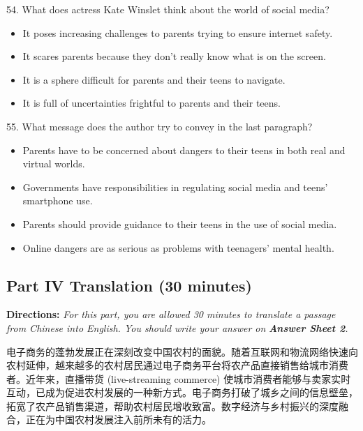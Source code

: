 \documentclass[UTF8,11pt]{ctexart}
\begin{document}
54. What does actress Kate Winslet think about the world of social media?


\begin{itemize}[leftmargin=2em,itemsep=.2em,topsep=.4em]\item[A.] It poses increasing challenges to parents trying to ensure internet safety.
\item[B.] It scares parents because they don’t really know what is on the screen.
\item[C.] It is a sphere difficult for parents and their teens to navigate.
\item[D.] It is full of uncertainties frightful to parents and their teens.
\end{itemize}

55. What message does the author try to convey in the last paragraph?


\begin{itemize}[leftmargin=2em,itemsep=.2em,topsep=.4em]\item[A.] Parents have to be concerned about dangers to their teens in both real and virtual worlds.
\item[B.] Governments have responsibilities in regulating social media and teens’ smartphone use.
\item[C.] Parents should provide guidance to their teens in the use of social media.
\item[D.] Online dangers are as serious as problems with teenagers’ mental health.
\end{itemize}

\subsection*{\textbf{Part IV Translation} \textbf{(30 minutes)}}


\textbf{Directions: }\textit{For this part, you are allowed 30 minutes to translate a passage from Chinese into English. You should} \textit{write your answer on }\textbf{\textit{Answer Sheet 2}}\textit{.}


电子商务的蓬勃发展正在深刻改变中国农村的面貌。随着互联网和物流网络快速向农村延伸，越来越多的农村居民通过电子商务平台将农产品直接销售给城市消费者。近年来，直播带货 (live-streaming commerce) 使城市消费者能够与卖家实时互动，已成为促进农村发展的一种新方式。电子商务打破了城乡之间的信息壁垒，拓宽了农产品销售渠道，帮助农村居民增收致富。数字经济与乡村振兴的深度融合，正在为中国农村发展注入前所未有的活力。
\end{document}
